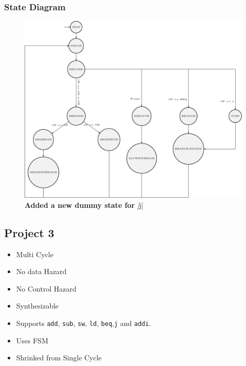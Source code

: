 \documentclass{article}
\begin{document}
\subsubsection*{State Diagram}
\begin{figure}[H]
    \begin{center}
        \includegraphics[scale=1]{MultiCycleImplementation/TexFiles/SD2.pdf}
        \caption*{\textbf{Added a new dummy state for }\textit|j|}
    \end{center}
\end{figure}



\subsection*{Project 3}

\begin{itemize}
    \item Multi Cycle
    \item No data Hazard
    \item No Control Hazard
    \item Synthesizable
    \item Supports \verb|add|, \verb|sub|, \verb|sw|, \verb|ld|, \verb|beq|,\verb|j| and \verb|addi|.
    \item Uses FSM
    \item Shrinked from Single Cycle
\end{itemize}
\end{document}
